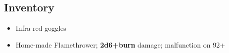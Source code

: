 \documentclass[12pt,a4paper]{article}
\begin{document}
\subsection*{Inventory}
\begin{itemize}
\item{Infra-red goggles}
\item{Home-made Flamethrower; \textbf{2d6+burn} damage; malfunction on 92+}
\end{itemize}
\end{document}
